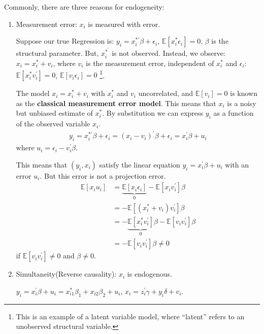 Commonly, there are three reasons for endogeneity:
\begin{enumerate}
    \item Measurement error: $x_i$ is measured with error.
        
        Suppose our true Regression is: $y_i = x_i^{* \prime} \beta +\epsilon_i$, $\mathbb{E}[x_i^* \epsilon_i] = 0$, $\beta$ is the structural parameter.
        But, $x_i^{*^{\prime}}$ is not observed. Instead, we observe: $x_i = x_i^* + v_i$, 
        where $v_i$ is the measurement error, independent of $x_i^*$ and $\epsilon_i$: $\mathbb{E}[x_i^* v_i^{\prime}] = 0$, $\mathbb{E}[v_i \epsilon_i] = 0$
        \footnote{This is an example of a latent variable model, where ``latent'' refers to an unobserved structural variable.}.

        The model $x_i = x_i^* + v_i$ with $x_i^*$ and $v_{i}$ uncorrelated, and $\mathbb{E}[v_i] = 0$ is known as the \textbf{classical measurement error model}.
        This means that $x_i$ is a noisy but unbiased estimate of $x_i^*$.
        By substitution we can express $y_i$ as a function of the observed variable $x_i$.
        \begin{gather*}
            y_i = x_i^{* \prime} \beta +\epsilon_i = (x_i - v_i)^{\prime} \beta +\epsilon_i = x_i^{\prime} \beta + u_i
        \end{gather*}
        where $u_i = \epsilon_i - v_i^{\prime} \beta$.

        This means that $(y_i, x_i)$ satisfy the linear equation $y_i = x_i^{\prime} \beta + u_i$ with an error $u_i$.
        But this error is not a projection error.
        \begin{align*}
            \mathbb{E}[x_i u_i] &= \underset{0}{\underbrace{\mathbb{E}[x_i \epsilon_i]}} - \mathbb{E}[x_i v_i^{\prime} ]\beta \\
            &= -\mathbb{E}[(x_i^* + v_i) v_i^{\prime} ]\beta \\
            &= -\underset{0}{\underbrace{\mathbb{E}[x_i^* v_i^{\prime}]}}\beta - \mathbb{E}[v_i v_i^{\prime} ]\beta \\
            &= - \mathbb{E}[v_i v_i^{\prime} ]\beta \neq 0
        \end{align*}
        if $\mathbb{E}[v_i v_i^{\prime}] \neq 0$ and $\beta \neq 0$.
    \item Simultaneity(Reverse causality): $x_i$ is endogenous.
    
        $y_i = x_i^{\prime} \beta + u_i = x_{i1}^* \beta_1 + x_{i2} \beta_2  + u_i$, $x_i = z_i^{\prime} \gamma + y_i \delta+ v_i$.\\


\end{enumerate}
